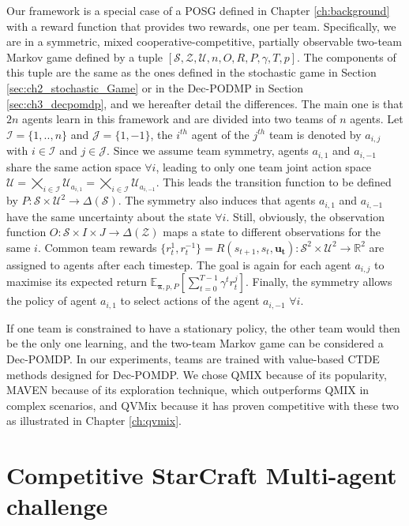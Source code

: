 Our framework is a special case of a POSG defined in Chapter \ref{ch:background} with a reward function that provides two rewards, one per team.
Specifically, we are in a symmetric, mixed cooperative-competitive, partially observable two-team Markov game defined by a tuple $[\mathcal{S}, \mathcal{Z}, \mathcal{U}, n, O, R, P, \gamma, T, p]$.
The components of this tuple are the same as the ones defined in the stochastic game in Section \ref{sec:ch2_stochastic_Game} or in the Dec-PODMP in Section \ref{sec:ch3_decpomdp}, and we hereafter detail the differences.
The main one is that $2n$ agents learn in this framework and are divided into two teams of $n$ agents.
Let $\mathcal{I}=\{1,..,n\}$ and $\mathcal{J}=\{1,-1\}$, the $i^{th}$ agent of the $j^{th}$ team is denoted by $a_{i, j}$ with $i \in \mathcal{I}$ and $ j \in \mathcal{J}$.
Since we assume team symmetry, agents $a_{i, 1}$ and $a_{i, -1}$ share the same action space $\forall i$, leading to only one team joint action space $\mathcal{U}=\bigtimes_{i\in \mathcal{I}} \mathcal{U}_{{a_{i, 1}}} = \bigtimes_{i\in \mathcal{I}} 
\mathcal{U}_{{a_{i, -1}}}$.
This leads the transition function to be defined by $P: \mathcal{S} \times \mathcal{U}^2 \rightarrow \Delta(\mathcal{S})$.
The symmetry also induces that agents $a_{i, 1}$ and $a_{i, -1}$ have the same uncertainty about the state $\forall i$.
Still, obviously, the observation function $O: \mathcal{S} \times I \times J \rightarrow \Delta(\mathcal{Z})$ maps a state to different observations for the same $i$.
Common team rewards $\{r_t^1, r_t^{-1}\} = R(s_{t+1}, s_t, \mathbf{u_t}): \mathcal{S}^2 \times \mathcal{U}^2 \rightarrow \mathbb{R}^2$ are assigned to agents after each timestep.
The goal is again for each agent $a_{i, j}$ to maximise its expected return $\mathbb{E}_{\mathbf{\pi}, p, P}\left[ \sum_{t=0}^{T-1} \gamma^t r^{j}_t \right]$.
Finally, the symmetry allows the policy of agent $a_{i, 1}$ to select actions of the agent $a_{i, -1}$ $\forall i$.

If one team is constrained to have a stationary policy, the other team would then be the only one learning, and the two-team Markov game can be considered a Dec-POMDP.
In our experiments, teams are trained with value-based CTDE methods designed for Dec-POMDP.
We chose QMIX because of its popularity, MAVEN because of its exploration technique, which outperforms QMIX in complex scenarios, and QVMix because it has proven competitive with these two as illustrated in Chapter \ref{ch:qvmix}.

\section{Competitive StarCraft Multi-agent challenge} \label{sec:ch7_competsmac}

